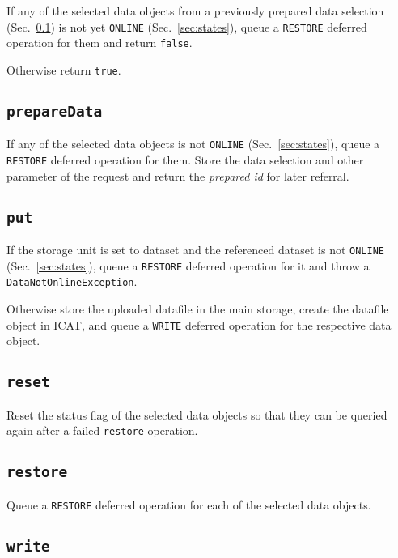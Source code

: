 \documentclass[paper=a4]{scrartcl}
\begin{document}
If any of the selected data objects from a previously prepared
data selection (Sec.~\ref{sec:requests:prepareData}) is not yet
\texttt{ONLINE} (Sec.~\ref{sec:states}), queue a \texttt{RESTORE}
deferred operation for them and return \texttt{false}.

Otherwise return \texttt{true}.

\subsection{\texttt{prepareData}}
\label{sec:requests:prepareData}

If any of the selected data objects is not \texttt{ONLINE}
(Sec.~\ref{sec:states}), queue a \texttt{RESTORE} deferred operation
for them.  Store the data selection and other parameter of the request
and return the \emph{prepared id} for later referral.

\subsection{\texttt{put}}
\label{sec:requests:put}

If the storage unit is set to dataset and the referenced dataset is
not \texttt{ONLINE} (Sec.~\ref{sec:states}), queue a \texttt{RESTORE}
deferred operation for it and throw a \texttt{DataNotOnlineException}.

Otherwise store the uploaded datafile in the main storage, create the
datafile object in ICAT, and queue a \texttt{WRITE} deferred operation
for the respective data object.

\subsection{\texttt{reset}}

Reset the status flag of the selected data objects so that they can
be queried again after a failed \texttt{restore} operation.

\subsection{\texttt{restore}}

Queue a \texttt{RESTORE} deferred operation for each of the selected
data objects.

\subsection{\texttt{write}}
\end{document}
